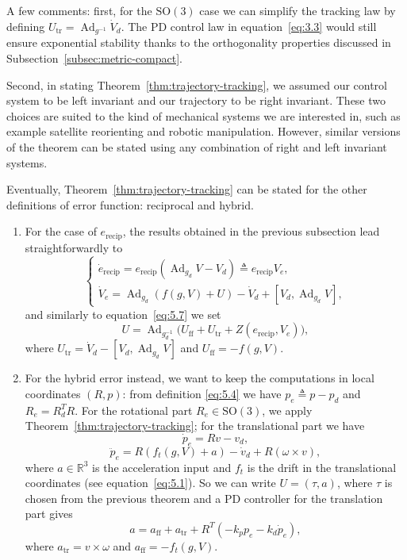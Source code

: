 \documentclass[11pt]{article}
\newcommand{\SO}{\mathrm{SO}}
\newcommand{\Ad}{\operatorname{Ad}}
\newcommand{\R}{\mathbb R}
\begin{document}
A few comments: first, for the $\SO(3)$ case we can simplify the tracking law by defining $U_{\mathrm{tr}}=\Ad_{g^{-1}}\dot V_d$. The PD control law in equation~\eqref{eq:3.3} would still ensure exponential stability thanks to the orthogonality properties discussed in Subsection~\ref{subsec:metric-compact}.

Second, in stating Theorem~\ref{thm:trajectory-tracking}, we assumed our control system to be left invariant and our trajectory to be right invariant. These two choices are suited to the kind of mechanical systems we are interested in, such as example satellite reorienting and robotic manipulation. However, similar versions of the theorem can be stated using any combination of right and left invariant systems.

Eventually, Theorem~\ref{thm:trajectory-tracking} can be stated for the other definitions of error function: reciprocal and hybrid.
\begin{enumerate}
\item For the case of $e_{\mathrm{recip}}$, the results obtained in the previous subsection lead straightforwardly to
\begin{equation*}
\begin{cases}
\dot e_{\mathrm{recip}}=e_{\mathrm{recip}}(\Ad_{g_d}V-V_d)\triangleq e_{\mathrm{recip}}V_e,\\
\dot V_e=\Ad_{g_d}(f(g,V)+U)-\dot V_d+[V_d,\Ad_{g_d}V],
\end{cases}
\end{equation*}
and similarly to equation~\eqref{eq:5.7} we set
\begin{equation*}
U=\Ad_{g_d^{-1}}\bigl(U_{\mathrm{ff}}+U_{\mathrm{tr}}+Z(e_{\mathrm{recip}},V_e)\bigr),
\end{equation*}
where $U_{\mathrm{tr}}=\dot V_d-[V_d,\Ad_{g_d}V]$ and $U_{\mathrm{ff}}=-f(g,V)$.
\item For the hybrid error instead, we want to keep the computations in local coordinates $(R,p)$: from definition \eqref{eq:5.4} we have $p_e\triangleq p-p_d$ and $R_e=R_d^TR$. For the rotational part $R_e\in\SO(3)$, we apply Theorem~\ref{thm:trajectory-tracking}; for the translational part we have
\begin{equation*}
\dot p_e=Rv-v_d,
\end{equation*}
\begin{equation*}
\ddot p_e=R(f_t(g,V)+a)-\dot v_d+R(\omega\times v),
\end{equation*}
where $a\in\R^3$ is the acceleration input and $f_t$ is the drift in the translational coordinates (see equation~\eqref{eq:5.1}). So we can write $U=(\tau,a)$, where $\tau$ is chosen from the previous theorem and a PD controller for the translation part gives
\begin{equation*}
a=a_{\mathrm{ff}}+a_{\mathrm{tr}}+R^T(-k_pp_e-k_d\dot p_e),\tag{5.8}\label{eq:5.8}
\end{equation*}
where $a_{\mathrm{tr}}=v\times\omega$ and $a_{\mathrm{ff}}=-f_t(g,V)$.
\end{enumerate}
\end{document}
